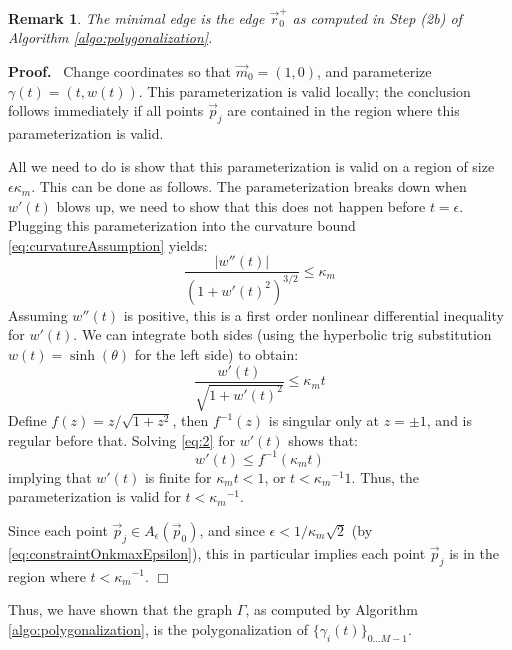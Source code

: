 \documentclass{article}
\newtheorem{varremark}[cntr]{Remark}
\newenvironment{remark}{\begin{varremark}\em}{\em\end{varremark}}
\newenvironment{proof}{
  \noindent\textbf{Proof.}\ }{\hspace*{\fill}
  \begin{math}\Box\end{math}\medskip}
\numberwithin{cntr}{section}
\numberwithin{equation}{section}
\newcommand{\abs}[1]{\left| #1 \right|}%
\newcommand{\vp}[0]{{\vec{p}}}
\newcommand{\vr}[0]{{\vec{r}}}
\newcommand{\vm}[0]{{\vec{m}}}
\newcommand{\Oto}[1]{{0 \ldots #1-1}}
\newcommand{\curveSet}{{ \{ \gamma_i(t) \}_{\Oto{M}}}}
\newcommand{\allowed}[2]{ { A_{#1}(#2) } }
\newcommand{\kmax}{{\kappa_{m}}}
\newcommand{\kmaxi}{{\kmax^{-1}}}
\begin{document}
\begin{remark}
  The minimal edge is the edge $\vr^{+}_{0}$ as computed in Step (2b) of Algorithm \ref{algo:polygonalization}.
\end{remark}

\begin{proof}
  Change coordinates so that $\vm_{0} = (1,0)$, and parameterize $\gamma(t)=(t,w(t))$. This parameterization is valid locally; the conclusion follows immediately if all points $\vp_{j}$ are contained in the region where this parameterization is valid.

  All we need to do is show that this parameterization is valid on a region of size $\epsilon \kmax$. This can be done as follows. The parameterization breaks down when $w'(t)$ blows up, we need to show that this does not happen before $t=\epsilon$. Plugging this parameterization into the curvature bound \eqref{eq:curvatureAssumption} yields:
  \begin{equation*}
    \frac{ \abs{w''(t)} }{(1+w'(t)^{2})^{3/2}} \leq \kmax
  \end{equation*}
  Assuming $w''(t)$ is positive, this is a first order nonlinear differential inequality for $w'(t)$. We can integrate both sides (using the hyperbolic trig substitution $w(t)=\sinh(\theta)$ for the left side) to obtain:
  \begin{equation}
    \label{eq:2}
    \frac{w'(t)}{\sqrt{1+w'(t)^{2}}} \leq \kmax t
  \end{equation}
  Define $f(z)=z/\sqrt{1+z^{2}}$, then $f^{-1}(z)$ is singular only at $z=\pm 1$, and is regular before that. Solving \eqref{eq:2} for $w'(t)$ shows that:
  \begin{equation*}
    w'(t) \leq f^{-1}(\kmax t)
  \end{equation*}
  implying that $w'(t)$ is finite for $\kmax t < 1$, or $t < \kmaxi 1$. Thus, the parameterization is valid for $t < \kmaxi$.

  Since each point $\vp_{j} \in \allowed{\epsilon}{\vp_{0}}$, and since $\epsilon < 1/\kmax \sqrt{2}$ (by \eqref{eq:constraintOnkmaxEpsilon}), this in particular implies each point $\vp_{j}$ is in the region where $t < \kmaxi$.
\end{proof}

Thus, we have shown that the graph $\Gamma$, as computed by Algorithm \ref{algo:polygonalization}, is the polygonalization of $\curveSet$.



\end{document}

